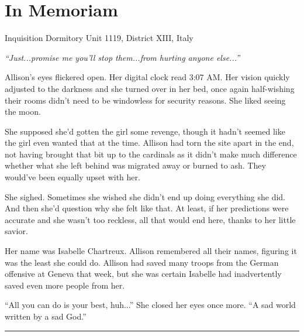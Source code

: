 \chapter{In Memoriam}
\begin{ChapterNote}
Inquisition Dormitory Unit 1119, District XIII, Italy
\end{ChapterNote}
\begin{Standard}
\emph{``Just...promise me you'll stop them...from hurting anyone else...''}

Allison's eyes flickered open. Her digital clock read 3:07 AM. Her vision
quickly adjusted to the darkness and she turned over in her bed, once again
half-wishing their rooms didn't need to be windowless for security reasons.
She liked seeing the moon.

She supposed she'd gotten the girl some revenge, though it hadn't seemed like
the girl even wanted that at the time. Allison had torn the site apart in the end,
not having brought that bit up to the cardinals as it didn't make much difference
whether what she left behind was migrated away or burned to ash. They would've
been equally upset with her.

She sighed. Sometimes she wished she didn't end up doing everything she did.
And then she'd question why she felt like that. At least, if her predictions were
accurate and she wasn't too reckless, all that would end here, thanks to her little savior.

Her name was Isabelle Chartreux. Allison remembered all their names, figuring
it was the least she could do. Allison had saved many troops from the German offensive
at Geneva that week, but she was certain Isabelle had inadvertently saved even
more people from her.

``All you can do is your best, huh...'' She closed her eyes once more. ``A sad world
written by a sad God.''

\fancybreak{* * *}
\end{Standard}
